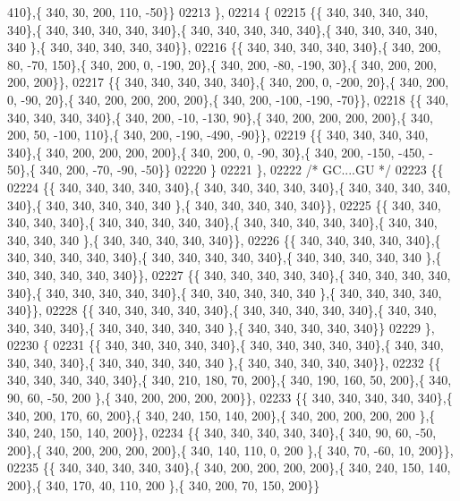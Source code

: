 \begin{DoxyCode}
      410\},\{ 340,  30, 200, 110, -50\}\}
02213 \},
02214 \{
02215 \{\{ 340, 340, 340, 340, 340\},\{ 340, 340, 340, 340, 340\},\{ 340, 340, 340, 340, 340\},\{ 340, 340, 340, 340, 340
      \},\{ 340, 340, 340, 340, 340\}\},
02216 \{\{ 340, 340, 340, 340, 340\},\{ 340, 200,  80, -70, 150\},\{ 340, 200,   0, -190,  20\},\{ 340, 200, -80, -190,  
      30\},\{ 340, 200, 200, 200, 200\}\},
02217 \{\{ 340, 340, 340, 340, 340\},\{ 340, 200,   0, -200,  20\},\{ 340, 200,   0, -90,  20\},\{ 340, 200, 200, 200, 
      200\},\{ 340, 200, -100, -190, -70\}\},
02218 \{\{ 340, 340, 340, 340, 340\},\{ 340, 200, -10, -130,  90\},\{ 340, 200, 200, 200, 200\},\{ 340, 200,  50, -100, 
      110\},\{ 340, 200, -190, -490, -90\}\},
02219 \{\{ 340, 340, 340, 340, 340\},\{ 340, 200, 200, 200, 200\},\{ 340, 200,   0, -90,  30\},\{ 340, 200, -150, -450, -
      50\},\{ 340, 200, -70, -90, -50\}\}
02220 \}
02221 \},
02222 \textcolor{comment}{/* GC....GU */}
02223 \{\{
02224 \{\{ 340, 340, 340, 340, 340\},\{ 340, 340, 340, 340, 340\},\{ 340, 340, 340, 340, 340\},\{ 340, 340, 340, 340, 340
      \},\{ 340, 340, 340, 340, 340\}\},
02225 \{\{ 340, 340, 340, 340, 340\},\{ 340, 340, 340, 340, 340\},\{ 340, 340, 340, 340, 340\},\{ 340, 340, 340, 340, 340
      \},\{ 340, 340, 340, 340, 340\}\},
02226 \{\{ 340, 340, 340, 340, 340\},\{ 340, 340, 340, 340, 340\},\{ 340, 340, 340, 340, 340\},\{ 340, 340, 340, 340, 340
      \},\{ 340, 340, 340, 340, 340\}\},
02227 \{\{ 340, 340, 340, 340, 340\},\{ 340, 340, 340, 340, 340\},\{ 340, 340, 340, 340, 340\},\{ 340, 340, 340, 340, 340
      \},\{ 340, 340, 340, 340, 340\}\},
02228 \{\{ 340, 340, 340, 340, 340\},\{ 340, 340, 340, 340, 340\},\{ 340, 340, 340, 340, 340\},\{ 340, 340, 340, 340, 340
      \},\{ 340, 340, 340, 340, 340\}\}
02229 \},
02230 \{
02231 \{\{ 340, 340, 340, 340, 340\},\{ 340, 340, 340, 340, 340\},\{ 340, 340, 340, 340, 340\},\{ 340, 340, 340, 340, 340
      \},\{ 340, 340, 340, 340, 340\}\},
02232 \{\{ 340, 340, 340, 340, 340\},\{ 340, 210, 180,  70, 200\},\{ 340, 190, 160,  50, 200\},\{ 340,  90,  60, -50, 200
      \},\{ 340, 200, 200, 200, 200\}\},
02233 \{\{ 340, 340, 340, 340, 340\},\{ 340, 200, 170,  60, 200\},\{ 340, 240, 150, 140, 200\},\{ 340, 200, 200, 200, 200
      \},\{ 340, 240, 150, 140, 200\}\},
02234 \{\{ 340, 340, 340, 340, 340\},\{ 340,  90,  60, -50, 200\},\{ 340, 200, 200, 200, 200\},\{ 340, 140, 110,   0, 200
      \},\{ 340,  70, -60,  10, 200\}\},
02235 \{\{ 340, 340, 340, 340, 340\},\{ 340, 200, 200, 200, 200\},\{ 340, 240, 150, 140, 200\},\{ 340, 170,  40, 110, 200
      \},\{ 340, 200,  70, 150, 200\}\}

\end{DoxyCode}
